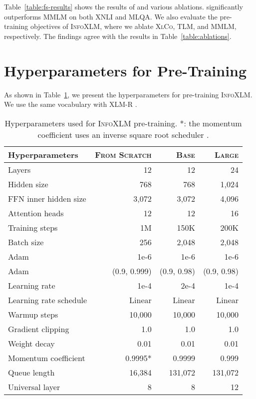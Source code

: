 \documentclass[11pt,a4paper]{article}
\newcommand\our{\textsc{InfoXLM}}
\newcommand\xlco{\textsc{XlCo}}
\begin{document}
Table~\ref{table:fs-results} shows the results of  and various ablations.
 significantly outperforms MMLM on both XNLI and MLQA.
We also evaluate the pre-training objectives of \our{}, where we ablate \xlco{}, TLM, and MMLM, respectively.
The findings agree with the results in Table~\ref{table:ablations}.


\section{Hyperparameters for Pre-Training}

As shown in Table~\ref{table:pt-hparam}, we present the hyperparameters for pre-training \our{}. We use the same vocabulary with XLM-R \cite{xlmr}.

\begin{table}[ht]
\centering
\scriptsize
\renewcommand\tabcolsep{2.8pt}
\begin{tabular}{lrrr}
\toprule
Hyperparameters & \textsc{From Scratch} & \textsc{Base} & \textsc{Large} \\ \midrule
Layers & 12 & 12 & 24 \\
Hidden size & 768 & 768 & 1,024 \\
FFN inner hidden size & 3,072 & 3,072 & 4,096 \\
Attention heads & 12 & 12 & 16 \\
Training steps & 1M & 150K & 200K \\
Batch size & 256 & 2,048 & 2,048 \\
Adam  & 1e-6 & 1e-6 & 1e-6 \\
Adam  & (0.9, 0.999) & (0.9, 0.98) & (0.9, 0.98) \\
Learning rate & 1e-4 & 2e-4 & 1e-4 \\
Learning rate schedule & Linear & Linear & Linear \\
Warmup steps & 10,000 & 10,000 & 10,000 \\
Gradient clipping & 1.0 & 1.0 & 1.0 \\
Weight decay & 0.01 & 0.01 & 0.01 \\
Momentum coefficient & 0.9995* & 0.9999 & 0.999 \\
Queue length & 16,384 & 131,072 & 131,072 \\
Universal layer & 8 & 8 & 12 \\
\bottomrule
\end{tabular}
\caption{Hyperparameters used for \our{} pre-training. *: the momentum coefficient uses an inverse square root scheduler .}
\label{table:pt-hparam}
\end{table}
\end{document}
